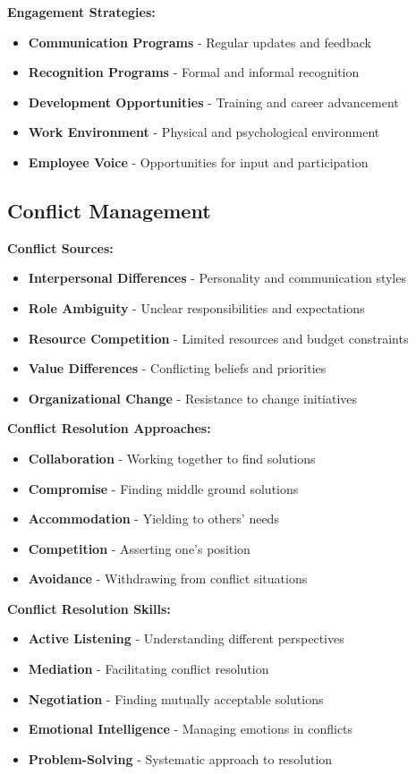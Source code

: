 \documentclass[12pt]{article}
\begin{document}
\textbf{Engagement Strategies:}
\begin{itemize}
    \item \textbf{Communication Programs} - Regular updates and feedback
    \item \textbf{Recognition Programs} - Formal and informal recognition
    \item \textbf{Development Opportunities} - Training and career advancement
    \item \textbf{Work Environment} - Physical and psychological environment
    \item \textbf{Employee Voice} - Opportunities for input and participation
\end{itemize}

\subsection{Conflict Management}

\textbf{Conflict Sources:}
\begin{itemize}
    \item \textbf{Interpersonal Differences} - Personality and communication styles
    \item \textbf{Role Ambiguity} - Unclear responsibilities and expectations
    \item \textbf{Resource Competition} - Limited resources and budget constraints
    \item \textbf{Value Differences} - Conflicting beliefs and priorities
    \item \textbf{Organizational Change} - Resistance to change initiatives
\end{itemize}

\textbf{Conflict Resolution Approaches:}
\begin{itemize}
    \item \textbf{Collaboration} - Working together to find solutions
    \item \textbf{Compromise} - Finding middle ground solutions
    \item \textbf{Accommodation} - Yielding to others' needs
    \item \textbf{Competition} - Asserting one's position
    \item \textbf{Avoidance} - Withdrawing from conflict situations
\end{itemize}

\textbf{Conflict Resolution Skills:}
\begin{itemize}
    \item \textbf{Active Listening} - Understanding different perspectives
    \item \textbf{Mediation} - Facilitating conflict resolution
    \item \textbf{Negotiation} - Finding mutually acceptable solutions
    \item \textbf{Emotional Intelligence} - Managing emotions in conflicts
    \item \textbf{Problem-Solving} - Systematic approach to resolution
\end{itemize}
\end{document}

